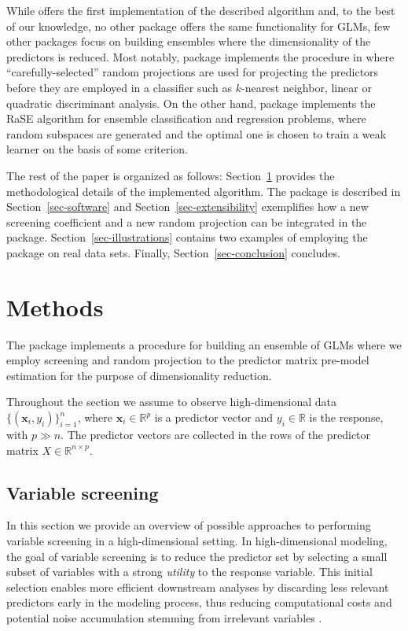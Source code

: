 \documentclass[
  article,
  nojss]{jss}
\begin{document}
While  offers the first implementation of the described
algorithm and, to the best of our knowledge, no other package offers the
same functionality for GLMs, few other  packages focus on
building ensembles where the dimensionality of the predictors is
reduced. Most notably, package  \citep{RPEnsembleR}
implements the procedure in \citet{cannings2017random} where
``carefully-selected'' random projections are used for projecting the
predictors before they are employed in a classifier such as
\(k\)-nearest neighbor, linear or quadratic discriminant analysis. On
the other hand, package  \citep{pkg:RaSEn} implements the
RaSE algorithm for ensemble classification and regression problems,
where random subspaces are generated and the optimal one is chosen to
train a weak learner on the basis of some criterion.

The rest of the paper is organized as follows: Section~\ref{sec-models}
provides the methodological details of the implemented algorithm. The
package is described in Section~\ref{sec-software} and
Section~\ref{sec-extensibility} exemplifies how a new screening
coefficient and a new random projection can be integrated in the
package. Section~\ref{sec-illustrations} contains two examples of
employing the package on real data sets. Finally,
Section~\ref{sec-conclusion} concludes.

\section{Methods}\label{sec-models}

The package implements a procedure for building an ensemble of GLMs
where we employ screening and random projection to the predictor matrix
pre-model estimation for the purpose of dimensionality reduction.

Throughout the section we assume to observe high-dimensional data
\(\{(\boldsymbol{x}_i,y_i)\}_{i=1}^n\), where
\(\boldsymbol{x}_i\in\mathbb{R}^p\) is a predictor vector and
\(y_i\in\mathbb{R}\) is the response, with \(p\gg n\). The predictor
vectors are collected in the rows of the predictor matrix
\(X\in \mathbb R^{n\times p}\).

\subsection{Variable screening}\label{variable-screening}

In this section we provide an overview of possible approaches to
performing variable screening in a high-dimensional setting. In
high-dimensional modeling, the goal of variable screening is to reduce
the predictor set by selecting a small subset of variables with a strong
\emph{utility} to the response variable. This initial selection enables
more efficient downstream analyses by discarding less relevant
predictors early in the modeling process, thus reducing computational
costs and potential noise accumulation stemming from irrelevant
variables \citep[see e.g.,][]{Dunson2020TargRandProj}.
\end{document}

